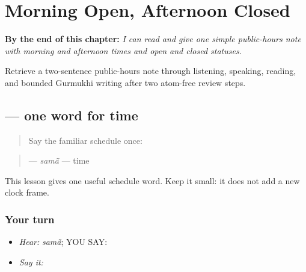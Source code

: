 
\chapter{Morning Open, Afternoon Closed}
\label{ch:pa-a2-schedule-status}

\begin{chapteropening}
\textbf{By the end of this chapter:} \emph{I can read and give one simple public-hours note with morning and afternoon times and open and closed statuses.}

Retrieve a two-sentence public-hours note through listening, speaking, reading, and bounded Gurmukhi writing after two atom-free review steps.
\end{chapteropening}

\section[\texorpdfstring{\pa{ਸਮਾਂ} (samaa)}{ਸਮਾਂ (samaa)}]{ — one word for time}

\label{lesson:PA-C179-samaa}



\begin{quote}
Say the familiar schedule once: \textbf{               }
\end{quote}

\begin{grammarlens}[title={Grammar Lens: one schedule noun}]
\begin{quote}
\textbf{} — \emph{samā̃} — time
\end{quote}

This lesson gives one useful schedule word. Keep it small: it does not add a new clock frame.
\end{grammarlens}

\subsection*{Your turn}
\begin{itemize}
\raggedright
  \item \emph{Hear:} \emph{samā̃}; YOU SAY: \textbf{}
  \item \emph{Say it:} \textbf{}
\end{itemize}

